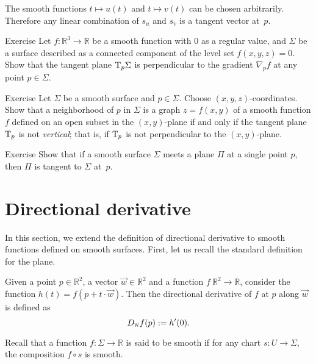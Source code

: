 The smooth functions $t\mapsto u(t)$ and $t\mapsto v(t)$ can be chosen arbitrarily.
Therefore any linear combination of $s_u$ and $s_v$ is a tangent vector at~$p$. 
\qeds


\begin{thm}{Exercise}\label{ex:tangent-normal}
Let $f:\mathbb{R}^3\to\mathbb{R}$ be a smooth function with $0$ as a regular value, and $\Sigma$ be a surface described as a connected component of the level set $f(x,y,z)=0$.
Show that the tangent plane $\mathrm{T}_p\Sigma$ is perpendicular to the gradient $\nabla_pf$ at any point $p\in\Sigma$.
\end{thm}

\begin{thm}{Exercise}\label{ex:vertical-tangent}
Let $\Sigma$ be a smooth surface and $p\in\Sigma$.
Choose $(x,y,z)$-coordinates.
Show that a neighborhood of $p$ in $\Sigma$ is a graph $z=f(x,y)$ of a smooth function $f$ defined on an open subset in the $(x,y)$-plane if and only if the tangent plane $\mathrm{T}_p$ is not {}\emph{vertical}; that is, if $\mathrm{T}_p$ is not perpendicular to the $(x,y)$-plane.
\end{thm}

\begin{thm}{Exercise}\label{ex:tangent-single-point}
Show that if a smooth surface $\Sigma$ meets a plane $\Pi$ at a single point $p$, then $\Pi$ is tangent to $\Sigma$ at~$p$.
\end{thm}

\section{Directional derivative}\label{sec:dirder}

In this section, we extend the definition of directional derivative to smooth functions defined on smooth surfaces.
First, let us recall the standard definition for the plane.

Given a point $p\in \mathbb{R}^2$, a vector $\vec w\in \mathbb{R}^2$ and a function $f\:\mathbb{R}^2\to\mathbb{R}$, 
consider the function
$h(t)=f(p+t\cdot\vec w)$.
Then the directional derivative of $f$ at $p$ along $\vec w$ is defined as 
\[D_{\text{\sc{w}}}f(p)\mathrel{:=} h'(0).\]

Recall that a function $f: \Sigma \to \mathbb{R}$ is said to be smooth if for any chart $s : U \to \Sigma$, the composition $f \circ s$ is smooth.

